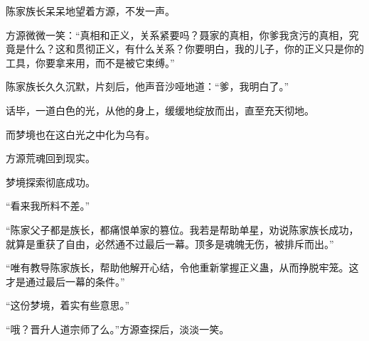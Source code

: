 \begin{this_body}
陈家族长呆呆地望着方源，不发一声。

方源微微一笑：“真相和正义，关系紧要吗？聂家的真相，你爹我贪污的真相，究竟是什么？这和贯彻正义，有什么关系？你要明白，我的儿子，你的正义只是你的工具，你要拿来用，而不是被它束缚。”

陈家族长久久沉默，片刻后，他声音沙哑地道：“爹，我明白了。”

话毕，一道白色的光，从他的身上，缓缓地绽放而出，直至充天彻地。

而梦境也在这白光之中化为乌有。

方源荒魂回到现实。

梦境探索彻底成功。

“看来我所料不差。”

“陈家父子都是族长，都痛恨单家的篡位。我若是帮助单星，劝说陈家族长成功，就算是重获了自由，必然通不过最后一幕。顶多是魂魄无伤，被排斥而出。”

“唯有教导陈家族长，帮助他解开心结，令他重新掌握正义蛊，从而挣脱牢笼。这才是通过最后一幕的条件。”

“这份梦境，着实有些意思。”

“哦？晋升人道宗师了么。”方源查探后，淡淡一笑。

\end{this_body}

